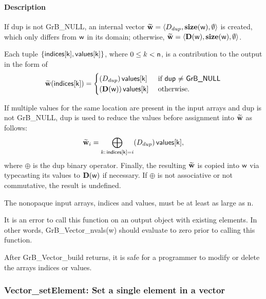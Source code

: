 \paragraph{Description }

If {\sf dup} is not {\sf GrB\_NULL}, an internal vector 
${\bf \widetilde{w}} = \langle D_{dup},\mathbf{size}({\sf w}),\emptyset \rangle$ 
is created, which only differs from ${\sf w}$ in its domain; otherwise, 
${\bf \widetilde{w}} = \langle \mathbf{D}({\sf w}),\mathbf{size}({\sf w}),\emptyset \rangle$.

Each tuple $\{ {\sf indices[k]}, {\sf values[k]}\}$, where $0\leq k < {\sf n}$, is a contribution to the output in the form of 
\[
{\bf \widetilde{w}}({\sf indices[k]}) = 
\begin{cases} 
(D_{dup})\, {\sf values[k]} & \text{ if {\sf dup} $\neq$ {\sf GrB\_NULL}} \\
(\mathbf{D}({\sf w}))\, {\sf values[k]} & \text{ otherwise.} 
\end{cases}
\]

If multiple values for the same location are present in the input arrays and 
{\sf dup} is not {\sf GrB\_NULL}, {\sf dup} is used to reduce the values 
before assignment into ${\bf \widetilde{w}}$ as follows: 
\[
{\bf \widetilde{w}}_{i}
= \bigoplus_{k:\, {\sf indices[k]} = i}  (D_{dup})\, {\sf values[k]}
,\] 
where $\oplus$ is the {\sf dup} binary operator. Finally, the resulting 
${\bf \widetilde{w}}$ is copied into ${\sf w}$ via typecasting its values to 
$\mathbf{D}({\sf w})$ if necessary.  If $\oplus$ is not associative or not 
commutative, the result is undefined.  

The nonopaque input arrays, {\sf indices} and {\sf values}, must be at least as
large as {\sf n}. 

It is an error to call this function on an output object with existing elements. In other words, 
{\sf GrB\_Vector\_nvals(w)} should evaluate to zero prior to calling this function.

After {\sf GrB\_Vector\_build} returns, it is safe for a programmer to 
modify or delete the arrays {\sf indices} or {\sf values}.


\subsubsection{{\sf Vector\_setElement}: Set a single element in a vector}


